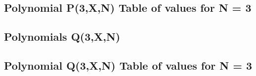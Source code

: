 \documentclass[12pt,letterpaper,oneside,reqno]{amsart}
\begin{document}
    \subsection{Polynomial P(3,X,N) Table of values for N = 3}
    

    \subsection{Polynomials Q(3,X,N)}
    

    \subsection{Polynomial Q(3,X,N) Table of values for N = 3}
    


%    
%    
\end{document}
